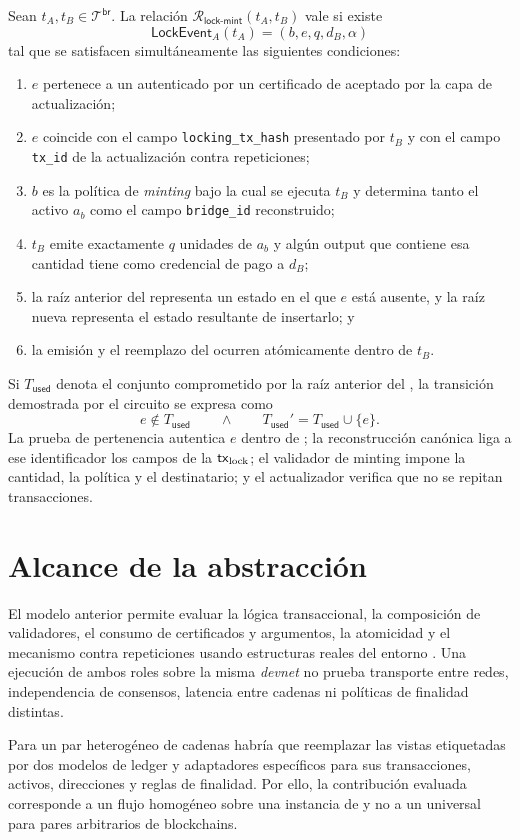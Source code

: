 \begin{definition}
\label{def:relacion-transferencia-lock-mint}
\normalfont
Sean $t_A,t_B\in\mathcal{T}^{\mathsf{br}}$. La relación $\mathcal{R}_{\mathsf{lock\text{-}mint}}(t_A,t_B)$ vale si existe
$$\mathsf{LockEvent}_A(t_A)=(b,e,q,d_B,\alpha)$$
tal que se satisfacen simultáneamente las siguientes condiciones:
\begin{enumerate}[noitemsep]
  \item $e$ pertenece a un \TransactionSnapshot autenticado por un certificado de \Mithril aceptado por la capa de actualización;
  \item $e$ coincide con el campo \texttt{locking\_tx\_hash} presentado por $t_B$ y con el campo \texttt{tx\_id} de la actualización contra repeticiones;
  \item $b$ es la política de \textit{minting} bajo la cual se ejecuta $t_B$ y determina tanto el activo $a_b$ como el campo \texttt{bridge\_id} reconstruido;
  \item $t_B$ emite exactamente $q$ unidades de $a_b$ y algún output que contiene esa cantidad tiene como credencial de pago a $d_B$;
  \item la raíz anterior del \SMT representa un estado en el que $e$ está ausente, y la raíz nueva representa el estado resultante de insertarlo; y
  \item la emisión y el reemplazo del \TxsUpdaterUTxO ocurren atómicamente dentro de $t_B$.
\end{enumerate}
\end{definition}

Si $T_{\mathsf{used}}$ denota el conjunto comprometido por la raíz anterior del \SMT, la transición demostrada por el circuito se expresa como
$$e\notin T_{\mathsf{used}} \qquad\land\qquad T_{\mathsf{used}}'=T_{\mathsf{used}}\cup\{e\}.$$
La prueba de pertenencia autentica $e$ dentro de \CardanoTransactions; la reconstrucción canónica liga a ese identificador los campos de la $\mathsf{tx}_{\mathrm{lock}}$; el validador de minting impone la cantidad, la política y el destinatario; y el actualizador verifica que no se repitan transacciones.

\section{Alcance de la abstracción}
\label{sec:modelo-cadenas-alcance-abstraccion}

El modelo anterior permite evaluar la lógica transaccional, la composición de validadores, el consumo de certificados y argumentos, la atomicidad y el mecanismo contra repeticiones usando estructuras reales del entorno \Cardano. Una ejecución de ambos roles sobre la misma \textit{devnet} no prueba transporte entre redes, independencia de consensos, latencia entre cadenas ni políticas de finalidad distintas.

Para un par heterogéneo de cadenas habría que reemplazar las vistas etiquetadas por dos modelos de ledger y adaptadores específicos para sus transacciones, activos, direcciones y reglas de finalidad. Por ello, la contribución evaluada corresponde a un flujo homogéneo sobre una instancia de \Cardano y no a un \zkBridge universal para pares arbitrarios de blockchains.
